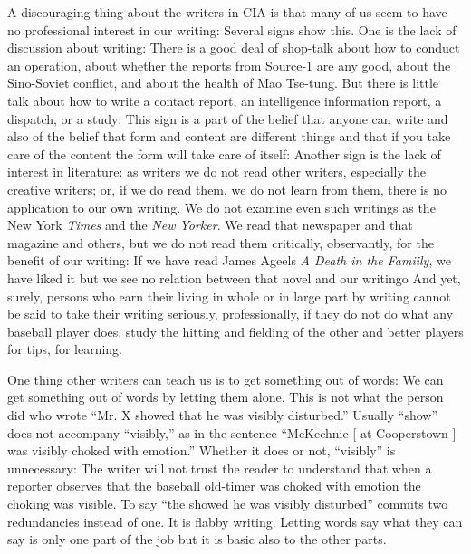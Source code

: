 \documentclass[
    oneside,
    11pt,
    draft
]{memoir}
\begin{document}
A discouraging thing about the writers in CIA is that many of us seem to have no professional interest in our writing: Several signs show this. One is the lack of discussion about writing: There is a good deal of shop-talk about how to conduct an operation, about whether the reports from Source-1 are any good, about the Sino-Soviet conflict, and about the health of Mao Tse-tung. But there is little talk about how to write a contact report, an intelligence information report, a dispatch, or a study: This sign is a part of the belief that anyone can write and also of the belief that form and content are different things and that if you take care of the content the form will take care of itself: Another sign is the lack of interest in literature: as writers we do not read other writers, especially the creative writers; or, if we do read them, we do not learn from them, there is no application to our own writing. We do not examine even such writings as the New York \emph{Times} and the \emph{New Yorker}. We read that newspaper and that magazine and others, but we do not read them critically, observantly, for the benefit of our writing: If we have read James Ageels \emph{A Death in the Famiily}, we have liked it but we see no relation between that novel and our writingo And yet, surely, persons who earn their living in whole or in large part by writing cannot be said to take their writing seriously, professionally, if they do not do what any baseball player does, study the hitting and fielding of the other and better players for tips, for learning.

One thing other writers can teach us is to get something out of words: We can get something out of words by letting them alone. This is not what the person did who wrote \enquote{Mr. X showed that he was visibly disturbed.} Usually \enquote{show} does not accompany \enquote{visibly,} as in the sentence \enquote{McKechnie [ at Cooperstown ] was visibly choked with emotion.} Whether it does or not, \enquote{visibly} is unnecessary: The writer will not trust the reader to understand that when a reporter observes that the baseball old-timer was choked with emotion the choking was visible. To say \enquote{the showed he was visibly disturbed} commits two redundancies instead of one. It is flabby writing. Letting words say what they can say is only one part of the job but it is basic also to the other parts. 
\end{document}
